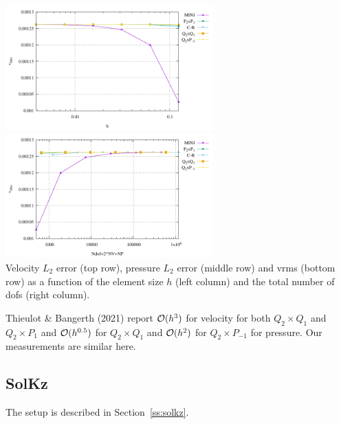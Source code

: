 \begin{center}
\includegraphics[width=8cm]{python_codes/fieldstone_112/results/exp3/vrms.pdf}
\includegraphics[width=8cm]{python_codes/fieldstone_112/results/exp3/vrms_ndof.pdf}\\
{\captionfont Velocity $L_2$ error (top row), pressure $L_2$ error (middle row) and vrms (bottom row) 
as a function of the element size $h$ (left column) and the total number of dofs (right column).}
\end{center}

Thieulot \& Bangerth (2021) \cite{thba21} report ${\cal O}(h^3)$ for velocity for both $Q_2\times Q_1$ and $Q_2\times P_1$
and ${\cal O}(h^{0.5})$ for $Q_2\times Q_1$ and  ${\cal O}(h^{2})$ for $Q_2\times P_{-1}$ for pressure. 
Our measurements are similar here.

\newpage
\subsection*{SolKz}

The setup is described in Section~\ref{ss:solkz}. 

